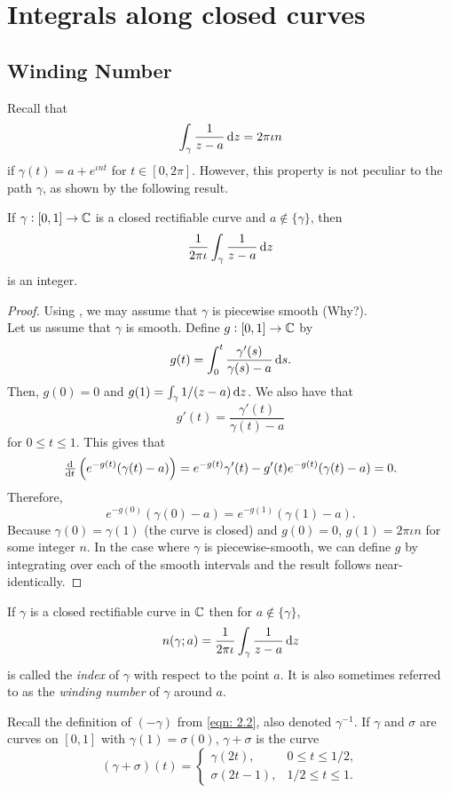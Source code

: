 \section{Integrals along closed curves}

	\subsection{Winding Number}

		Recall that
		\[ \int_\gamma \frac{1}{z-a} \dif z  = 2 \pi \iota n \]
		if $\gamma(t) = a + e^{\iota n t}$ for $t \in [0,2\pi]$. However, this property is not peculiar to the path $\gamma$, as shown by the following result.

		\begin{ftheo}
			If $\gamma : [0,1] \to \mathbb{C}$ is a closed rectifiable curve and $a \not\in \{\gamma\}$, then
			\[ \frac{1}{2\pi\iota} \int_\gamma \frac{1}{z-a} \dif z \]
			is an integer.
		\end{ftheo}
		\begin{proof}
			Using , we may assume that $\gamma$ is piecewise smooth (Why?). \\
			Let us assume that $\gamma$ is smooth.
			Define $g : [0,1] \to \mathbb{C}$ by
			\[ g(t) = \int_0^t \frac{\gamma'(s)}{\gamma(s) - a} \dif s. \]
			Then, $g(0) = 0$ and $g(1) = \int_\gamma 1/(z-a) \dif z$. We also have that
			\[ g'(t) = \frac{\gamma'(t)}{\gamma(t) - a} \]
			for $0 \le t \le 1$. This gives that
			\[ \od{}{t} \left(e^{-g(t)}(\gamma(t) - a)\right) = e^{-g(t)} \gamma'(t) - g'(t) e^{-g(t)} (\gamma(t)-a) = 0. \]
			Therefore,
			\[ e^{-g(0)} (\gamma(0) - a) = e^{-g(1)} (\gamma(1) - a). \]
			Because $\gamma(0) = \gamma(1)$ (the curve is closed) and $g(0) = 0$, $g(1) = 2\pi\iota n$ for some integer $n$.
			In the case where $\gamma$ is piecewise-smooth, we can define $g$ by integrating over each of the smooth intervals and the result follows near-identically.
		\end{proof}

		\begin{fdef}
			If $\gamma$ is a closed rectifiable curve in $\mathbb{C}$ then for $a \not\in \{\gamma\}$,
			\[ n(\gamma;a) = \frac{1}{2\pi\iota} \int_\gamma \frac{1}{z-a} \dif z \]
			is called the \emph{index} of $\gamma$ with respect to the point $a$. It is also sometimes referred to as the \emph{winding number} of $\gamma$ around $a$.
		\end{fdef}
		Recall the definition of $(-\gamma)$ from \eqref{eqn: 2.2}, also denoted $\gamma^{-1}$. If $\gamma$ and $\sigma$ are curves on $[0,1]$ with $\gamma(1) = \sigma(0)$, $\gamma+\sigma$ is the curve
		\[ (\gamma+\sigma)(t) = \begin{cases} \gamma(2t), & 0 \le t \le 1/2, \\ \sigma(2t-1), & 1/2 \le t \le 1. \end{cases} \]

